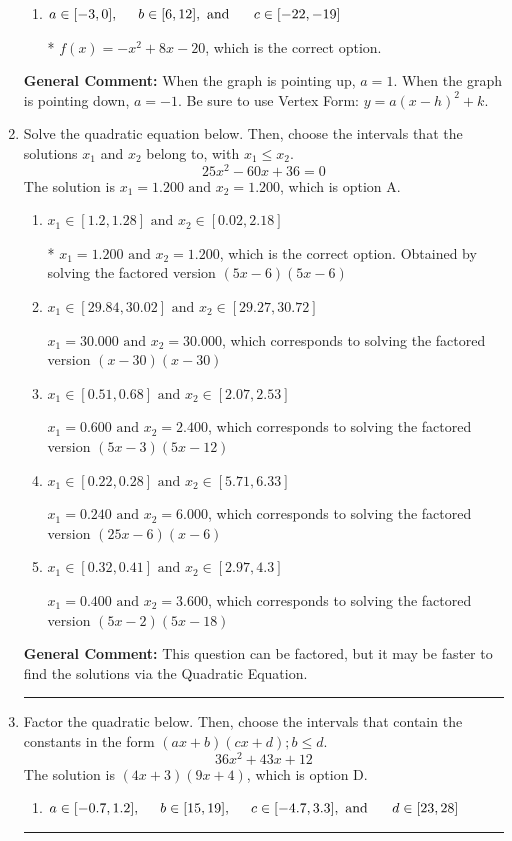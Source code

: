 \documentclass{extbook}[14pt]
\newcommand{\litem}[1]{\item #1

\rule{\textwidth}{0.4pt}}
\begin{document}
\begin{enumerate}
{\begin{enumerate}[label=\Alph*.]
$f(x)=-x^{2} -8 x -20$, which corresponds to incorrectly using vertex form as $f(x) = a(x+h)^2+k$.
\item \( a \in [-3, 0], \hspace*{5mm} b \in [6, 12], \text{ and } \hspace*{5mm} c \in [-22, -19] \)

* $f(x)=-x^{2} +8 x -20$, which is the correct option.
\end{enumerate}

\textbf{General Comment:} When the graph is pointing up, $a=1$. When the graph is pointing down, $a=-1$. Be sure to use Vertex Form: $y = a(x-h)^2+k$.
}
\litem{
Solve the quadratic equation below. Then, choose the intervals that the solutions $x_1$ and $x_2$ belong to, with $x_1 \leq x_2$.
\[ 25x^{2} -60 x + 36 = 0 \]The solution is \( x_1 = 1.200 \text{ and } x_2 = 1.200 \), which is option A.\begin{enumerate}[label=\Alph*.]
\item \( x_1 \in [1.2, 1.28] \text{ and } x_2 \in [0.02, 2.18] \)

* $x_1 = 1.200 \text{ and } x_2 = 1.200$, which is the correct option. Obtained by solving the factored version $(5x -6)(5x -6)$
\item \( x_1 \in [29.84, 30.02] \text{ and } x_2 \in [29.27, 30.72] \)

$x_1 = 30.000 \text{ and } x_2 = 30.000$, which corresponds to solving the factored version $(x -30)(x -30)$
\item \( x_1 \in [0.51, 0.68] \text{ and } x_2 \in [2.07, 2.53] \)

$x_1 = 0.600 \text{ and } x_2 = 2.400$, which corresponds to solving the factored version $(5x -3)(5x -12)$
\item \( x_1 \in [0.22, 0.28] \text{ and } x_2 \in [5.71, 6.33] \)

$x_1 = 0.240 \text{ and } x_2 = 6.000$, which corresponds to solving the factored version $(25x -6)(x -6)$
\item \( x_1 \in [0.32, 0.41] \text{ and } x_2 \in [2.97, 4.3] \)

$x_1 = 0.400 \text{ and } x_2 = 3.600$, which corresponds to solving the factored version $(5x -2)(5x -18)$
\end{enumerate}

\textbf{General Comment:} This question can be factored, but it may be faster to find the solutions via the Quadratic Equation.
}
\litem{
Factor the quadratic below. Then, choose the intervals that contain the constants in the form $(ax+b)(cx+d); b \leq d.$
\[ 36x^{2} +43 x + 12 \]The solution is \( (4x + 3)(9x + 4) \), which is option D.\begin{enumerate}[label=\Alph*.]
\item \( a \in [-0.7, 1.2], \hspace*{5mm} b \in [15, 19], \hspace*{5mm} c \in [-4.7, 3.3], \text{ and } \hspace*{5mm} d \in [23, 28] \)


\end{enumerate}}
\end{enumerate}
\end{document}
